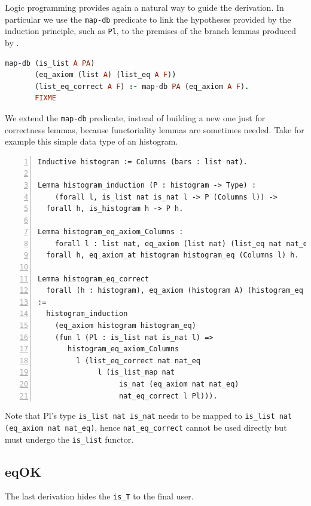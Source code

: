 \documentclass[sigplan,10pt,review]{acmart}\settopmatter{printfolios=true,printccs=false,printacmref=false}
\newcommand{\derive}[1]{\keys{#1}}
\begin{document}
Logic programming provides again a natural way to guide the
derivation. In particular we use the \lstinline+map-db+ predicate
to link the hypotheses provided by the induction principle,
such as \lstinline+Pl+, to the premises of the branch lemmas
produced by \derive{eqK}. 

\begin{lstlisting}[language=Prolog]
map-db (is_list A PA)
       (eq_axiom (list A) (list_eq A F))
       (list_eq_correct A F) :- map-db PA (eq_axiom A F).
       FIXME
\end{lstlisting}

\noindent
We extend the \lstinline+map-db+ predicate, instead of building
a new one just for correctness lemmas, because functoriality lemmas
are sometimes needed. Take for example this simple data type
of an histogram.

\begin{lstlisting}[numbers=left]
Inductive histogram := Columns (bars : list nat).

Lemma histogram_induction (P : histogram -> Type) :
    (forall l, is_list nat is_nat l -> P (Columns l)) ->
  forall h, is_histogram h -> P h.

Lemma histogram_eq_axiom_Columns :
    forall l : list nat, eq_axiom (list nat) (list_eq nat nat_eq) l ->
  forall h, eq_axiom_at histogram histogram_eq (Columns l) h.

Lemma histogram_eq_correct 
  forall (h : histogram), eq_axiom (histogram A) (histogram_eq A fa) h
:=
  histogram_induction 
    (eq_axiom histogram histogram_eq)
    (fun l (Pl : is_list nat is_nat l) =>
       histogram_eq_axiom_Columns
         l (list_eq_correct nat nat_eq
              l (is_list_map nat
                   is_nat (eq_axiom nat nat_eq)
                   nat_eq_correct l Pl))).
\end{lstlisting}

\noindent
Note that Pl's type \lstinline+is_list nat is_nat+
needs to be mapped to \lstinline+is_list nat (eq_axiom nat nat_eq)+,
hence \lstinline+nat_eq_correct+ cannot be used directly
but must undergo the \lstinline+is_list+ functor.

\subsection{eqOK} %

The last derivation hides the \lstinline+is_T+ to the final user.
\end{document}
